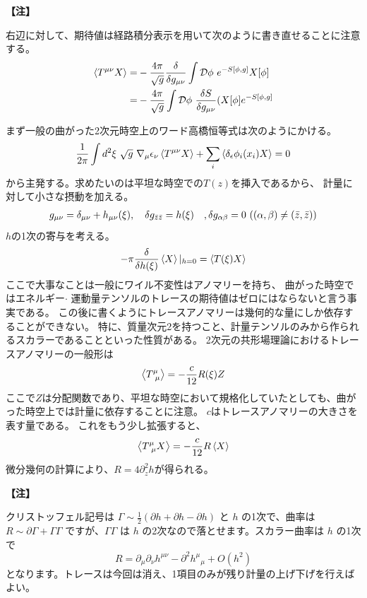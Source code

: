 \documentclass[11pt, dvipdfmx]{article}
\numberwithin{equation}{section}
\newenvironment{note}{
    \vspace{1ex} %
    \par\footnotesize\noindent\textbf{【注】}
}{
    \par\vspace{1ex} %
}
\begin{document}
\begin{note}
    右辺に対して、期待値は経路積分表示を用いて次のように書き直せることに注意する。
    \begin{align}
        \ev{T^{\mu\nu}X}=&-\frac{4\pi}{\sqrt{g}}\frac{\delta}{\delta g_{\mu\nu}}\int \mathcal{D}\phi \ e^{-S[\phi,g]} X[\phi]\\
        =&-\frac{4\pi}{\sqrt{g}}\int \mathcal{D}\phi \ \frac{\delta S}{\delta g_{\mu\nu}}( X[\phi] e^{-S[\phi,g]} 
    \end{align}
\end{note}
まず一般の曲がった2次元時空上のワード高橋恒等式は次のようにかける。
\begin{align}
    \frac{1}{2\pi}\int d^2\xi \ \sqrt{g} \ \nabla_\mu \epsilon_\nu \ev{T^{\mu\nu}X}+\sum_i \ev{\delta_{\epsilon} \phi_i(x_i) X} = 0
\end{align}
から主発する。求めたいのは平坦な時空での$T(z)$を挿入であるから、
計量に対して小さな摂動を加える。
\begin{align}
    g_{\mu\nu}=\delta_{\mu\nu}+h_{\mu\nu}(\xi), \quad \delta g_{\bar{z}\bar{z}}=h(\xi)\quad,\delta g_{\alpha\beta}=0\ \qty((\alpha,\beta) \neq (\bar{z},\bar{z}))\label{ma}
\end{align}
$h$の1次の寄与を考える。
\begin{align}
    -\pi \frac{\delta}{\delta h(\xi)}\ev{X}|_{h=0}=\ev{T(\xi)X}\label{h1order}
\end{align}
ここで大事なことは一般にワイル不変性はアノマリーを持ち、
曲がった時空ではエネルギー$\cdot$ 運動量テンソルのトレースの期待値はゼロにはならないと言う事実である。
この後に書くようにトレースアノマリーは幾何的な量にしか依存することができない。
特に、質量次元2を持つこと、計量テンソルのみから作られるスカラーであることといった性質がある。
2次元の共形場理論におけるトレースアノマリーの一般形は
\begin{align}
    \ev{T^\mu_{\ \mu}}=-\frac{c}{12}R(\xi)Z
\end{align}
ここで$Z$は分配関数であり、平坦な時空において規格化していたとしても、曲がった時空上では計量に依存することに注意。
$c$はトレースアノマリーの大きさを表す量である。
これをもう少し拡張すると、
\begin{align}
    \ev{T^\mu_{\ \mu}X}=-\frac{c}{12}R\ev{X}
\end{align}
微分幾何の計算により、$R=4\partial_z^2 h$が得られる。
\begin{note}
    クリストッフェル記号は $\Gamma \sim \tfrac12(\partial h + \partial h - \partial h)$ と $h$ の1次で、曲率は $R \sim \partial\Gamma + \Gamma\Gamma$ ですが、$\Gamma\Gamma$ は $h$ の2次なので落とせます。スカラー曲率は $h$ の1次で
\[R = \partial_\mu\partial_\nu h^{\mu\nu} - \partial^2 h^\mu{}_\mu + O(h^2)\]
となります。トレースは今回は消え、1項目のみが残り計量の上げ下げを行えばよい。
\end{note}
\end{document}
